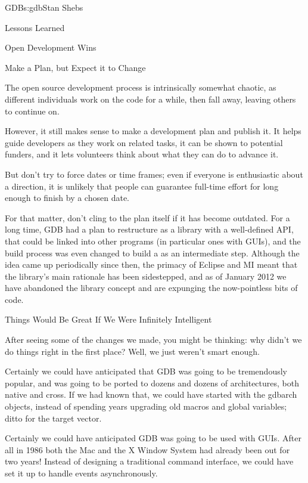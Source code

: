\begin{aosachapter}{GDB}{s:gdb}{Stan Shebs}
\begin{aosasect1}{Lessons Learned}
\begin{aosasect2}{Open Development Wins}
\end{aosasect2}

\begin{aosasect2}{Make a Plan, but Expect it to Change}

The open source development process is intrinsically somewhat chaotic,
as different individuals work on the code for a while, then fall away,
leaving others to continue on.

However, it still makes sense to make a development plan and publish
it.  It helps guide developers as they work on related tasks, it can
be shown to potential funders, and it lets volunteers think about what they can do
to advance it.

But don't try to force dates or time frames; even if everyone is
enthusiastic about a direction, it is unlikely that people can
guarantee full-time effort for long enough to finish by a chosen date.

For that matter, don't cling to the plan itself if it has become
outdated.  For a long time, GDB had a plan to restructure as a library
 with a well-defined API, that could be linked into other
programs (in particular ones with GUIs), and the build process was
even changed to build a  as an intermediate step.
Although the idea came up periodically since then, the primacy of
Eclipse and MI meant that the library's main rationale has been
sidestepped, and as of January 2012 we have abandoned the library
concept and are expunging the now-pointless bits of code.

\end{aosasect2}

\begin{aosasect2}{Things Would Be Great If We Were Infinitely Intelligent}

After seeing some of the changes we made, you might be thinking: why
didn't we do things right in the first place?  Well, we just weren't
smart enough.

Certainly we could have anticipated that GDB was going to be
tremendously popular, and was going to be ported to dozens and dozens
of architectures, both native and cross.  If we had known that, we
could have started with the gdbarch objects, instead of spending years
upgrading old macros and global variables;  ditto for the target
vector.

Certainly we could have anticipated GDB was going to be used with
GUIs. After all in 1986 both the Mac and the X Window System had
already been out for two years!  Instead of designing a traditional
command interface, we could have set it up to handle events
asynchronously.


\end{aosasect2}
\end{aosasect1}
\end{aosachapter}
